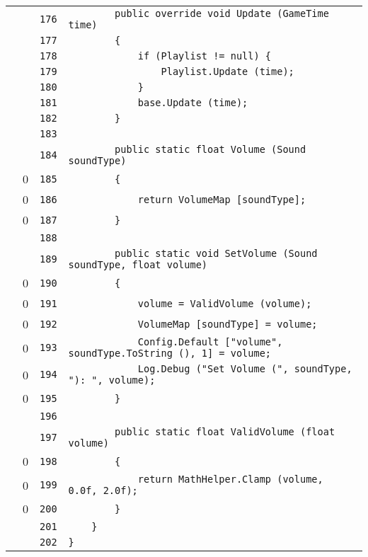 \documentclass[a4paper,10pt]{article}
\begin{document}
\begin{longtable}[l]{lrrl}
\cellcolor{gray} &  & \verb~176~ & \verb~        public override void Update (GameTime time)~\\
\cellcolor{gray} &  & \verb~177~ & \verb~        {~\\
\cellcolor{gray} &  & \verb~178~ & \verb~            if (Playlist != null) {~\\
\cellcolor{gray} &  & \verb~179~ & \verb~                Playlist.Update (time);~\\
\cellcolor{gray} &  & \verb~180~ & \verb~            }~\\
\cellcolor{gray} &  & \verb~181~ & \verb~            base.Update (time);~\\
\cellcolor{gray} &  & \verb~182~ & \verb~        }~\\
\cellcolor{gray} &  & \verb~183~ & \verb~~\\
\cellcolor{gray} &  & \verb~184~ & \verb~        public static float Volume (Sound soundType)~\\
\cellcolor{red} & 0 & \verb~185~ & \verb~        {~\\
\cellcolor{red} & 0 & \verb~186~ & \verb~            return VolumeMap [soundType];~\\
\cellcolor{red} & 0 & \verb~187~ & \verb~        }~\\
\cellcolor{gray} &  & \verb~188~ & \verb~~\\
\cellcolor{gray} &  & \verb~189~ & \verb~        public static void SetVolume (Sound soundType, float volume)~\\
\cellcolor{red} & 0 & \verb~190~ & \verb~        {~\\
\cellcolor{red} & 0 & \verb~191~ & \verb~            volume = ValidVolume (volume);~\\
\cellcolor{red} & 0 & \verb~192~ & \verb~            VolumeMap [soundType] = volume;~\\
\cellcolor{red} & 0 & \verb~193~ & \verb~            Config.Default ["volume", soundType.ToString (), 1] = volume;~\\
\cellcolor{red} & 0 & \verb~194~ & \verb~            Log.Debug ("Set Volume (", soundType, "): ", volume);~\\
\cellcolor{red} & 0 & \verb~195~ & \verb~        }~\\
\cellcolor{gray} &  & \verb~196~ & \verb~~\\
\cellcolor{gray} &  & \verb~197~ & \verb~        public static float ValidVolume (float volume)~\\
\cellcolor{red} & 0 & \verb~198~ & \verb~        {~\\
\cellcolor{red} & 0 & \verb~199~ & \verb~            return MathHelper.Clamp (volume, 0.0f, 2.0f);~\\
\cellcolor{red} & 0 & \verb~200~ & \verb~        }~\\
\cellcolor{gray} &  & \verb~201~ & \verb~    }~\\
\cellcolor{gray} &  & \verb~202~ & \verb~}~\\
\end{longtable}
\newpage
\end{document}
